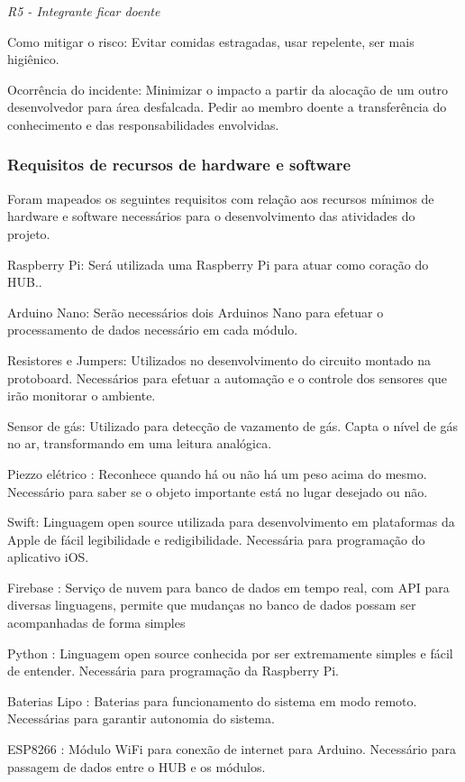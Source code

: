 {\itshape R5 -\/ Integrante ficar doente}


\begin{DoxyItemize}
\item Como mitigar o risco\+: Evitar comidas estragadas, usar repelente, ser mais higiênico.
\item Ocorrência do incidente\+: Minimizar o impacto a partir da alocação de um outro desenvolvedor para área desfalcada. Pedir ao membro doente a transferência do conhecimento e das responsabilidades envolvidas.
\end{DoxyItemize}

\subsubsection*{Requisitos de recursos de hardware e software }

Foram mapeados os seguintes requisitos com relação aos recursos mínimos de hardware e software necessários para o desenvolvimento das atividades do projeto.


\begin{DoxyItemize}
\item Raspberry Pi\+: Será utilizada uma Raspberry Pi para atuar como coração do H\+UB..
\item Arduino Nano\+: Serão necessários dois Arduinos Nano para efetuar o processamento de dados necessário em cada módulo.
\item Resistores e Jumpers\+: Utilizados no desenvolvimento do circuito montado na protoboard. Necessários para efetuar a automação e o controle dos sensores que irão monitorar o ambiente.
\item Sensor de gás\+: Utilizado para detecção de vazamento de gás. Capta o nível de gás no ar, transformando em uma leitura analógica.
\item Piezzo elétrico \+: Reconhece quando há ou não há um peso acima do mesmo. Necessário para saber se o objeto importante está no lugar desejado ou não.
\item Swift\+: Linguagem open source utilizada para desenvolvimento em plataformas da Apple de fácil legibilidade e redigibilidade. Necessária para programação do aplicativo i\+OS.
\item Firebase \+: Serviço de nuvem para banco de dados em tempo real, com A\+PI para diversas linguagens, permite que mudanças no banco de dados possam ser acompanhadas de forma simples
\item Python \+: Linguagem open source conhecida por ser extremamente simples e fácil de entender. Necessária para programação da Raspberry Pi.
\item Baterias Lipo \+: Baterias para funcionamento do sistema em modo remoto. Necessárias para garantir autonomia do sistema.
\item E\+S\+P8266 \+: Módulo Wi\+Fi para conexão de internet para Arduino. Necessário para passagem de dados entre o H\+UB e os módulos.
\end{DoxyItemize}

